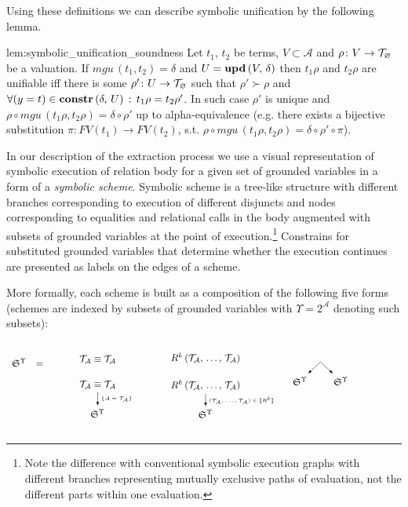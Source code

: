 Using these definitions we can describe symbolic unification by the following lemma.

\begin{replemma}{lem:symbolic_unification_soundness}
Let $t_1$, $t_2$ be terms,  $V \subset \mathcal{A}$ and $\rho \colon V \to \mathcal{T}_{\varnothing}$ be a valuation. If $mgu\,(t_1, t_2) = \delta$ and $U = \mbox{\textbf{upd}}\,(V,\, \delta) $  then $t_1 \rho$ and $t_2 \rho$ are unifiable iff there is some $\rho' \colon U \to \mathcal{T}_{\varnothing}$ such that $\rho' \succ \rho$ and $\forall (y = t) \in \mbox{\textbf{constr}}\,(\delta,\, U)\,:\, t_1 \rho = t_2 \rho'$.
In such case $\rho'$ is unique and $ \rho \circ mgu\,(t_1 \rho, t_2 \rho) = \delta\circ\rho' $ up to alpha-equivalence (e.g. there exists a bijective substitution $\pi : FV(t_1) \to FV(t_2)$, s.t. $ \rho \circ mgu\,(t_1 \rho, t_2 \rho) = \delta \circ\rho'\circ \pi$).
\end{replemma}

In our description of the extraction process we use a visual representation of symbolic execution of relation body for a given set of grounded variables in a form of a \emph{symbolic scheme}.
Symbolic scheme is a tree-like structure with different branches corresponding to execution of different disjuncts and nodes corresponding to equalities and relational calls in the body
augmented with subsets of grounded variables at the point of execution.\footnote{Note the difference with conventional symbolic execution graphs
with different branches representing mutually exclusive paths of evaluation, not the different parts within one evaluation.} Constrains for substituted
grounded variables that determine whether the execution continues are presented as labels on the edges of a scheme.

More formally, each scheme is built as a composition of the following five forms (schemes are indexed by subsets of grounded variables with $\Upsilon = 2^{\mathcal{A}}$ denoting such subsets):

\[
\renewcommand{\arraystretch}{3}
\begin{array}{ccm{0.5cm}m{3cm}m{4cm}m{4cm}}
  \schemewithvset{\mathfrak{S}}{\Upsilon} & = && \schemenode{$\unigoal{\mathcal{T}_\mathcal{A}}{\mathcal{T}_\mathcal{A}}$} & \schemenode{$\invokegoal{R^k}{\mathcal{T}_\mathcal{A}}{\mathcal{T}_\mathcal{A}}$} 
                                       & \multirow{2}{*}{\schemefork{$\schemewithvset{\mathfrak{S}}{\Upsilon}$}{$\schemewithvset{\mathfrak{S}}{\Upsilon}$}} \\
                                   &   && \schemesarrow{$\unigoal{\mathcal{T}_\mathcal{A}}{\mathcal{T}_\mathcal{A}}$}{$\{\mathcal{A}=\mathcal{T}_\mathcal{A}\}$}{$\schemewithvset{\mathfrak{S}}{\Upsilon}$}
                                       & \schemedarrow{$\invokegoal{R^k}{\mathcal{T}_\mathcal{A}}{\mathcal{T}_\mathcal{A}}$}{$(\mathcal{T}_\mathcal{A}, \dots, \mathcal{T}_\mathcal{A}) \in \sembr{R^k}$}{$\schemewithvset{\mathfrak{S}}{\Upsilon}$}
                                       & 
\end{array}
\]

